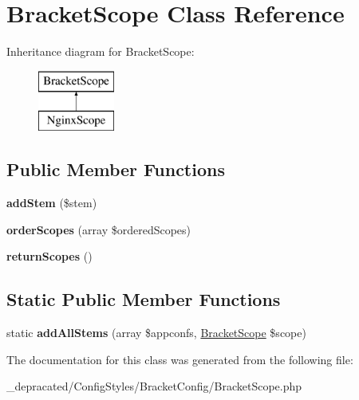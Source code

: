 \hypertarget{class_config_styles_1_1_bracket_config_1_1_bracket_scope}{
\section{\-Bracket\-Scope \-Class \-Reference}
\label{class_config_styles_1_1_bracket_config_1_1_bracket_scope}
}
\-Inheritance diagram for \-Bracket\-Scope\-:\begin{figure}[H]
\begin{center}
\leavevmode
\includegraphics[height=2.000000cm]{class_config_styles_1_1_bracket_config_1_1_bracket_scope}
\end{center}
\end{figure}
\subsection*{\-Public \-Member \-Functions}
\begin{DoxyCompactItemize}
\item 
\hypertarget{class_config_styles_1_1_bracket_config_1_1_bracket_scope_abbe7f98af49eac3eac9eb85536f40495}{
{\bfseries add\-Stem} (\$stem)}
\label{class_config_styles_1_1_bracket_config_1_1_bracket_scope_abbe7f98af49eac3eac9eb85536f40495}

\item 
\hypertarget{class_config_styles_1_1_bracket_config_1_1_bracket_scope_a0e094b9e3ea722808e98430534208617}{
{\bfseries order\-Scopes} (array \$ordered\-Scopes)}
\label{class_config_styles_1_1_bracket_config_1_1_bracket_scope_a0e094b9e3ea722808e98430534208617}

\item 
\hypertarget{class_config_styles_1_1_bracket_config_1_1_bracket_scope_afc7d625c52e91efbe239cc9f4ecb1171}{
{\bfseries return\-Scopes} ()}
\label{class_config_styles_1_1_bracket_config_1_1_bracket_scope_afc7d625c52e91efbe239cc9f4ecb1171}

\end{DoxyCompactItemize}
\subsection*{\-Static \-Public \-Member \-Functions}
\begin{DoxyCompactItemize}
\item 
\hypertarget{class_config_styles_1_1_bracket_config_1_1_bracket_scope_abb6b5b8b49878fe7d15642aba276d89e}{
static {\bfseries add\-All\-Stems} (array \$appconfs, \hyperlink{class_config_styles_1_1_bracket_config_1_1_bracket_scope}{\-Bracket\-Scope} \$scope)}
\label{class_config_styles_1_1_bracket_config_1_1_bracket_scope_abb6b5b8b49878fe7d15642aba276d89e}

\end{DoxyCompactItemize}


\-The documentation for this class was generated from the following file\-:\begin{DoxyCompactItemize}
\item 
\-\_\-depracated/\-Config\-Styles/\-Bracket\-Config/\-Bracket\-Scope.\-php\end{DoxyCompactItemize}
